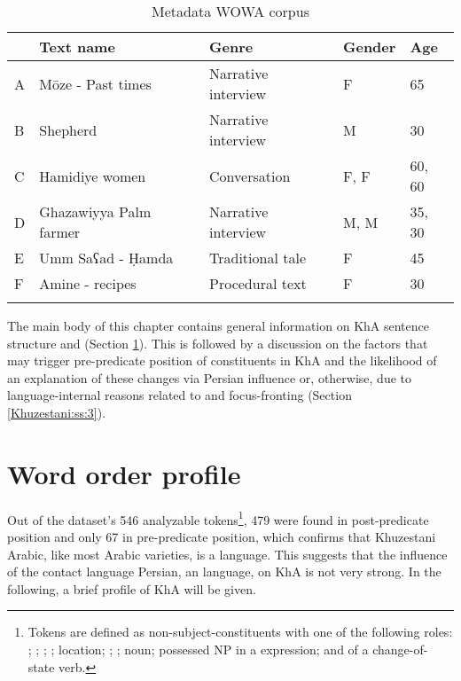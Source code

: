 \documentclass[output=paper,colorlinks,citecolor=brown,draftmode]{langscibook}
\begin{document}
\begin{table}
\begin{tabularx}{\textwidth}{lQlll}
\lsptoprule
& \textbf{Text name} & \textbf{Genre} & \textbf{Gender } & \textbf{Age} \\
\midrule
A & Mōze - Past times & Narrative interview & F & 65 \\
B & Shepherd & Narrative interview & M & 30 \\
C & Hamidiye women & Conversation & F, F & 60, 60 \\
D & Ghazawiyya Palm farmer & Narrative interview & M, M & 35, 30 \\
E & Umm Saʕad - Ḥamda & Traditional tale & F & 45 \\
F & Amine - recipes & Procedural text & F & 30 \\
\lspbottomrule
 \end{tabularx}
 \caption{Metadata WOWA corpus}
 \label{Khuzestani:tab:1}
\end{table}


The main body of this chapter contains general information on KhA sentence structure and  (Section \ref{Khuzestani:ss:2}). This is followed by a discussion on the factors that may trigger pre-predicate position of constituents in KhA and the likelihood of an explanation of these changes via Persian influence or, otherwise, due to language-internal reasons related to  and focus-fronting (Section \ref{Khuzestani:ss:3}).

\section{Word order profile}\label{Khuzestani:ss:2}
\largerpage
Out of the dataset's 546 analyzable tokens\footnote{Tokens are defined as non-subject-constituents with one of the following roles: ; ; ; ; location; ; ;   noun; possessed NP in a  expression; and  of a change-of-state verb.}, 479 were found in post-predicate position and only 67 in pre-predicate position, which confirms that Khuzestani Arabic, like most Arabic varieties, is a  language. This suggests that the influence of the contact language Persian, an  language, on KhA  is not very strong. In the following, a brief  profile of KhA will be given. 
\end{document}
